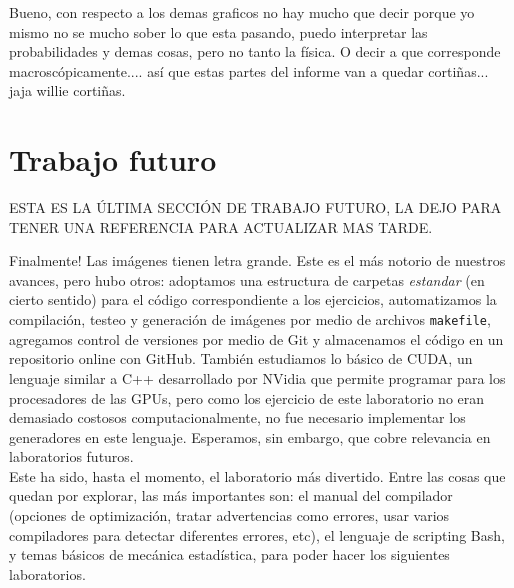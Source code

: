 \documentclass[a4paper,12pt]{article}
\begin{document}
Bueno, con respecto a los demas graficos no hay mucho que decir porque yo mismo no se mucho sober lo que esta pasando, puedo interpretar las probabilidades y demas cosas, pero no tanto la física. O decir a que corresponde macroscópicamente.... así que estas partes del informe van a quedar cortiñas... jaja willie cortiñas.

\section{Trabajo futuro}

ESTA ES LA ÚLTIMA SECCIÓN DE TRABAJO FUTURO, LA DEJO PARA TENER UNA REFERENCIA PARA ACTUALIZAR MAS TARDE.

Finalmente! Las imágenes tienen letra grande. Este es el más notorio de nuestros avances, pero hubo otros: adoptamos una estructura de carpetas {\it estandar} (en cierto sentido) para el código correspondiente a los ejercicios, automatizamos la compilación, testeo y generación de imágenes por medio de archivos \verb|makefile|, agregamos control de versiones por medio de Git y almacenamos el código en un repositorio online con GitHub. También estudiamos lo básico de CUDA, un lenguaje similar a C++ desarrollado por NVidia que permite programar para los procesadores de las GPUs, pero como los ejercicio de este laboratorio no eran demasiado costosos computacionalmente, no fue necesario implementar los generadores en este lenguaje. Esperamos, sin embargo, que cobre relevancia en laboratorios futuros.\\

Este ha sido, hasta el momento, el laboratorio más divertido. Entre las cosas que quedan por explorar, las más importantes son: el manual del compilador (opciones de optimización, tratar advertencias como errores, usar varios compiladores para detectar diferentes errores, etc), el lenguaje de scripting Bash, y temas básicos de mecánica estadística, para poder hacer los siguientes laboratorios.

%



\end{document}
